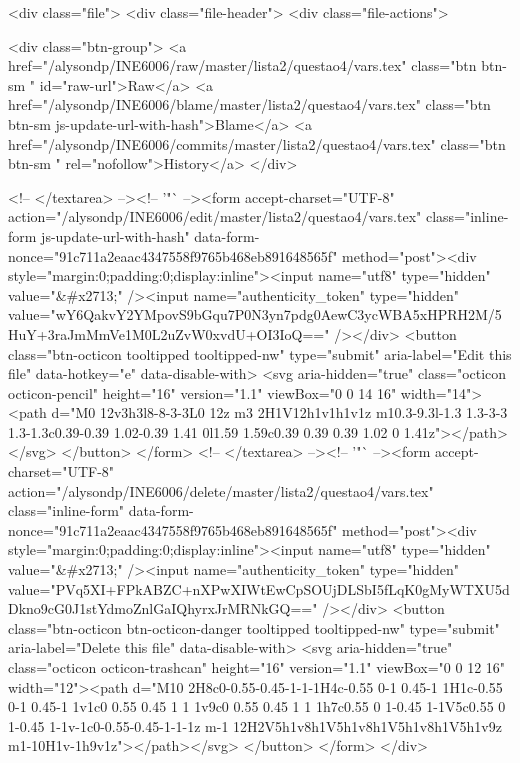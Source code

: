 <div class="file">
  <div class="file-header">
  <div class="file-actions">

    <div class="btn-group">
      <a href="/alysondp/INE6006/raw/master/lista2/questao4/vars.tex" class="btn btn-sm " id="raw-url">Raw</a>
        <a href="/alysondp/INE6006/blame/master/lista2/questao4/vars.tex" class="btn btn-sm js-update-url-with-hash">Blame</a>
      <a href="/alysondp/INE6006/commits/master/lista2/questao4/vars.tex" class="btn btn-sm " rel="nofollow">History</a>
    </div>


        <!-- </textarea> --><!-- '"` --><form accept-charset="UTF-8" action="/alysondp/INE6006/edit/master/lista2/questao4/vars.tex" class="inline-form js-update-url-with-hash" data-form-nonce="91c711a2eaac4347558f9765b468eb891648565f" method="post"><div style="margin:0;padding:0;display:inline"><input name="utf8" type="hidden" value="&#x2713;" /><input name="authenticity_token" type="hidden" value="wY6QakvY2YMpovS9bGqu7P0N3yn7pdg0AewC3ycWBA5xHPRH2M/5HuY+3raJmMmVe1M0L2uZvW0xvdU+OI3IoQ==" /></div>
          <button class="btn-octicon tooltipped tooltipped-nw" type="submit"
            aria-label="Edit this file" data-hotkey="e" data-disable-with>
            <svg aria-hidden="true" class="octicon octicon-pencil" height="16" version="1.1" viewBox="0 0 14 16" width="14"><path d="M0 12v3h3l8-8-3-3L0 12z m3 2H1V12h1v1h1v1z m10.3-9.3l-1.3 1.3-3-3 1.3-1.3c0.39-0.39 1.02-0.39 1.41 0l1.59 1.59c0.39 0.39 0.39 1.02 0 1.41z"></path></svg>
          </button>
</form>        <!-- </textarea> --><!-- '"` --><form accept-charset="UTF-8" action="/alysondp/INE6006/delete/master/lista2/questao4/vars.tex" class="inline-form" data-form-nonce="91c711a2eaac4347558f9765b468eb891648565f" method="post"><div style="margin:0;padding:0;display:inline"><input name="utf8" type="hidden" value="&#x2713;" /><input name="authenticity_token" type="hidden" value="PVq5XI+FPkABZC+nXPwXIWtEwCpSOUjDLSbI5fLqK0gMyWTXU5dDkno9cG0J1stYdmoZnlGaIQhyrxJrMRNkGQ==" /></div>
          <button class="btn-octicon btn-octicon-danger tooltipped tooltipped-nw" type="submit"
            aria-label="Delete this file" data-disable-with>
            <svg aria-hidden="true" class="octicon octicon-trashcan" height="16" version="1.1" viewBox="0 0 12 16" width="12"><path d="M10 2H8c0-0.55-0.45-1-1-1H4c-0.55 0-1 0.45-1 1H1c-0.55 0-1 0.45-1 1v1c0 0.55 0.45 1 1 1v9c0 0.55 0.45 1 1 1h7c0.55 0 1-0.45 1-1V5c0.55 0 1-0.45 1-1v-1c0-0.55-0.45-1-1-1z m-1 12H2V5h1v8h1V5h1v8h1V5h1v8h1V5h1v9z m1-10H1v-1h9v1z"></path></svg>
          </button>
</form>  </div>

